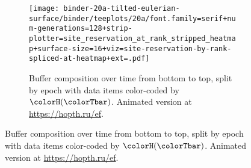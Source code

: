 \begin{figure}[htbp!]
\begin{subfigure}[b]{\linewidth}
\texttt{[image: 
binder-20a-tilted-eulerian-surface/binder/teeplots/20a/font.family=serif+num-generations=128+strip-plotter=site\_reservation\_at\_rank\_stripped\_heatmap+surface-size=16+viz=site-reservation-by-rank-spliced-at-heatmap+ext=.pdf]}
\vspace{-4.5ex}\caption{\footnotesize
  Buffer composition over time from bottom to top, split by epoch with data items color-coded by \hv{} $\colorH(\colorTbar)$.
  Animated version at \url{https://hopth.ru/ef}.
}
\label{fig:hsurf-tilted-implementation-schematic}
\end{subfigure}




\end{figure}
